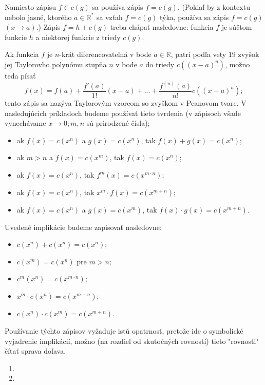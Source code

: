 Namiesto zápisu $f\in c(g)$ sa používa zápis $f=c(g)$. (Pokiaľ by z kontextu nebolo jasné, ktorého $a\in\mathbb{R^*}$ sa vzťah $f=c(g)$ týka, používa sa zápis $f=c(g)$ $(x\rightarrow a).$) Zápis $f=h+c(g)$ treba chápať nasledovne: funkcia $f$ je súčtom funkcie $h$ a niektorej funkcie z triedy $c(g)$. 

Ak funkcia $f$ je $n$-krát diferencovateľná v bode $a\in\mathbb{R}$, patrí podľa vety $19$ zvyšok jej Taylorovho polynómu stupňa $n$ v bode $a$ do triedy $c((x-a)^n)$, možno teda písať 
$$f(x)=f(a)+\frac{f'(a)}{1!}(x-a)+...+\frac{f^{(n)}(a)}{n!}c((x-a)^n);$$
tento zápis sa nazýva Taylorovým vzorcom so zvyškom v Peanovom tvare.
V nasledujúcich príkladoch budeme používať tieto tvrdenia (v zápisoch všade vynechávame $x\rightarrow 0;m,n$ sú prirodzené čísla);
\begin{itemize}
\item ak $f(x)=c(x^n)$ a $g(x)=c(x^n)$, tak $f(x)+g(x)=c(x^n)$;
\item ak $m>n$ a $f(x)=c(x^m)$, tak $f(x)=c(x^n)$;
\item ak $f(x)=c(x^n)$, tak $f^m(x)=c(x^{m\cdot n})$;
\item ak $f(x)=c(x^n)$, tak $x^m\cdot f(x)=c(x^{m+n})$;
\item ak $f(x)=c(x^n)$ a $g(x)=c(x^m)$, tak $f(x)\cdot g(x)=c(x^{m+n})$.
\end{itemize}

Uvedené implikácie budeme zapisovať nasledovne:
\begin{itemize}
\item $c(x^n)+c(x^n)=c(x^n)$;
\item $c(x^m)=c(x^n)$ pre $m>n$;
\item $c^m(x^n)=c(x^{m\cdot n})$;
\item $x^m\cdot c(x^n)=c(x^{m+n})$;
\item $c(x^n)\cdot c(x^m)=c(x^{m+n})$.
\end{itemize}

Používanie týchto zápisov vyžaduje istú opatrnosť, pretože ide o symbolické vyjadrenie implikácií, možno (na rozdiel od skutočných rovností) tieto "rovnosti" čítať sprava doľava.

\begin{enumerate}[resume]
	\item {}
	\item {}
\end{enumerate}

